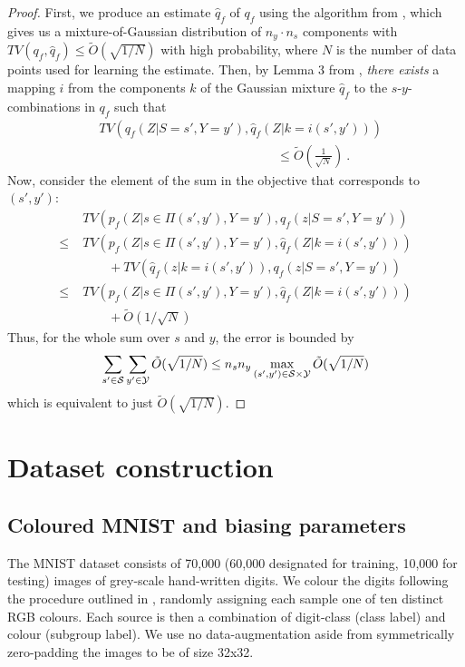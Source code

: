 \begin{proof}
First, we produce an estimate \(\hat{q}_f\) of \(q_f\) using the algorithm from
\citet{ashtiani2020near}, which gives us a mixture-of-Gaussian distribution of \(n_y\cdot n_s\)
components with \(TV(q_f, \hat{q}_f)\leq \tilde{O}(\sqrt{1/N})\) with high probability, where \(N\)
is the number of data points used for learning the estimate. Then, by Lemma 3 from
\citet{SohDunAngGuetal20}, \emph{there exists} a mapping \(i\) from the components \(k\) of the
Gaussian mixture \(\hat{q}_f\) to the \(s\)-\(y\)-combinations in \(q_f\) such that
%
\begin{align}
&TV(q_f(Z|S=s',Y=y'),\hat{q}_f(Z|k=i(s',y'))) \\
&\quad\quad\quad\quad\quad\quad\quad\quad\quad\quad\quad\quad\quad\quad\leq
\tilde{O}\left(\frac{1}{\sqrt{N}}\right)~. \nonumber
\end{align}
%
Now, consider the element of the sum in the objective that corresponds
to \((s',y')\):
%
\begin{align}
&TV(p_f(Z|s\in \Pi(s',y'),Y=y'), q_f(z|S=s',Y=y'))\nonumber\\
\leq \;&TV(p_f(Z|s\in \Pi(s',y'),Y=y'), \hat{q}_f(Z|k=i(s',y')))\nonumber\\
&\quad\quad+TV(\hat{q}_f(z|k=i(s',y')), q_f(z|S=s',Y=y'))\nonumber\\
\leq \;&TV(p_f(Z|s\in \Pi(s',y'),Y=y'), \hat{q}_f(Z|k=i(s',y'))) \nonumber\\
&\quad\quad+\tilde{O}(1/\sqrt{N})
\end{align}
%
Thus, for the whole sum over \(s\) and \(y\), the error is bounded by
\begin{align}
\sum\limits_{s'\in{\mathcal{S}}}\sum\limits_{y^\prime\in{\mathcal{Y}}}\tilde{O}(\sqrt{1/N})
\leq n_sn_y \max\limits_{(s',y')\in{\mathcal{S}}\times{\mathcal{Y}}}\tilde{O}(\sqrt{1/N})
\end{align}
which is equivalent to just \(\tilde{O}(\sqrt{1/N})\).
\end{proof}
%
\section{Dataset construction}\label{sec:dataset-construction}
%
\subsection{Coloured MNIST and biasing parameters}
%
The MNIST dataset \citep{lecun1998gradient} consists of 70,000 (60,000 designated for training,
10,000 for testing) images of grey-scale hand-written digits. We colour the digits following the
procedure outlined in \citet{KehBarThoQua20}, randomly assigning each sample one of ten distinct RGB
colours. Each source is then a combination of digit-class (class label) and colour (subgroup label).
We use no data-augmentation aside from symmetrically zero-padding the images to be of size 32x32.

